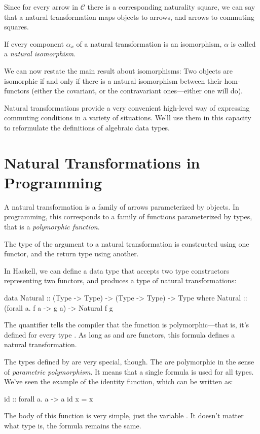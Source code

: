 \documentclass[DaoFP]{subfiles}
\begin{document}
Since for every arrow in $\mathcal{C}$ there is a corresponding naturality square, we can say that a natural transformation maps objects to arrows, and arrows to commuting squares.

If every component $\alpha_x$ of a natural transformation is an isomorphism, $\alpha$ is called a \emph{natural isomorphism}. 

We can now restate the main result about isomorphisms: Two objects are isomorphic if and only if there is a natural isomorphism between their hom-functors (either the covariant, or the contravariant ones---either one will do).

Natural transformations provide a very convenient high-level way of expressing commuting conditions in a variety of situations. We'll use them in this capacity to reformulate the definitions of algebraic data types.

\section{Natural Transformations in Programming}

A natural transformation is a family of arrows parameterized by objects. In programming, this corresponds to a family of functions parameterized by types, that is a \emph{polymorphic function}. 

The type of the argument to a natural transformation is constructed using one functor, and the return type using another. 

In Haskell, we can define a data type that accepts two type constructors representing two functors, and produces a type of natural transformations:

\begin{haskell}
data Natural :: (Type -> Type) -> (Type -> Type) -> Type where
  Natural :: (forall a. f a -> g a) -> Natural f g
\end{haskell}
The  quantifier tells the compiler that the function is polymorphic---that is, it's defined for every type . As long as  and  are functors, this formula defines a natural transformation. 

The types defined by  are very special, though. The are polymorphic in the sense of \emph{parametric polymorphism}. It means that a single formula is used for all types. We've seen the example of the identity function, which can be written as:
\begin{haskell}
id :: forall a. a -> a
id x = x
\end{haskell}
The body of this function is very simple, just the variable . It doesn't matter what type  is, the formula remains the same.
\end{document}
